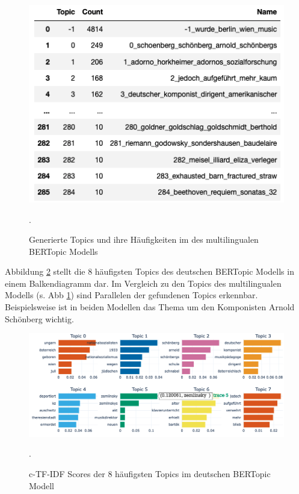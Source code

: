 \documentclass[ngerman]{ttlab-qualify}
\begin{document}
\begin{figure}[H]
\begin{center}
\includegraphics[width=12cm]{grafiken/285_topics.png}
\caption[Generierte Topics und ihre Häufigkeiten des multilingualen BERTopic Modells]{Generierte Topics und ihre Häufigkeiten im des multilingualen BERTopic Modells}.
\label{all_topics} 
\end{center}
\end{figure} 
\noindent Abbildung \ref{most_frequent_topics_de} stellt die 8 häufigsten Topics des deutschen BERTopic Modells in einem Balkendiagramm dar. Im Vergleich zu den Topics des multilingualen Modells (s. Abb \ref{all_topics}) sind Parallelen der gefundenen Topics erkennbar. Beispielsweise ist in beiden Modellen das Thema um den Komponisten Arnold Schönberg wichtig. 
\begin{figure}[H]
\begin{center}
\includegraphics[width=17cm]{grafiken/Topic_word_scores.png}
\caption[c-TF-IDF Scores der 8 häufigsten Topics im deutschen BERTopic Modell]{c-TF-IDF Scores der 8 häufigsten Topics im deutschen BERTopic Modell}.
\label{most_frequent_topics_de}
\end{center}
\end{figure} 
\end{document}
